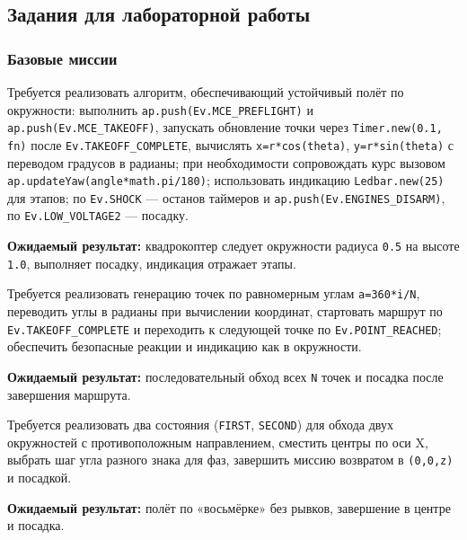 \subsection{Задания для лабораторной работы}
\subsubsection{Базовые миссии}

\begin{taskbox}[Полёт по окружности радиуса \texttt{r=0.5} на высоте \texttt{z=1.0}]
Требуется реализовать алгоритм, обеспечивающий устойчивый полёт по окружности: выполнить \texttt{ap.push(Ev.MCE\_PREFLIGHT)} и \texttt{ap.push(Ev.MCE\_TAKEOFF)}, запускать обновление точки через \texttt{Timer.new(0.1, fn)} после \texttt{Ev.TAKEOFF\_COMPLETE}, вычислять \texttt{x=r*cos(theta)}, \texttt{y=r*sin(theta)} с переводом градусов в радианы; при необходимости сопровождать курс вызовом \texttt{ap.updateYaw(angle*math.pi/180)}; использовать индикацию \texttt{Ledbar.new(25)} для этапов; по \texttt{Ev.SHOCK} — останов таймеров и \texttt{ap.push(Ev.ENGINES\_DISARM)}, по \texttt{Ev.LOW\_VOLTAGE2} — посадку.

\textbf{Ожидаемый результат:} квадрокоптер следует окружности радиуса \texttt{0.5} на высоте \texttt{1.0}, выполняет посадку, индикация отражает этапы.
\end{taskbox}

\begin{taskbox}
Требуется реализовать генерацию точек по равномерным углам \texttt{a=360*i/N}, переводить углы в радианы при вычислении координат, стартовать маршрут по \texttt{Ev.TAKEOFF\_COMPLETE} и переходить к следующей точке по \texttt{Ev.POINT\_REACHED}; обеспечить безопасные реакции и индикацию как в окружности.

\textbf{Ожидаемый результат:} последовательный обход всех \texttt{N} точек и посадка после завершения маршрута.
\end{taskbox}

\begin{taskbox}
Требуется реализовать два состояния (\texttt{FIRST}, \texttt{SECOND}) для обхода двух окружностей с противоположным направлением, сместить центры по оси X, выбрать шаг угла разного знака для фаз, завершить миссию возвратом в \texttt{(0,0,z)} и посадкой.

\textbf{Ожидаемый результат:} полёт по «восьмёрке» без рывков, завершение в центре и посадка.
\end{taskbox}

